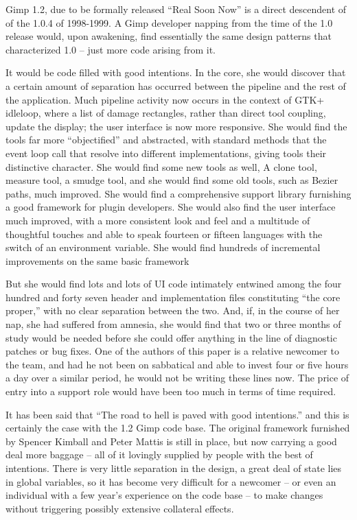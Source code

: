 
Gimp 1.2, due to be formally released ``Real Soon Now'' is a direct
descendent of of the 1.0.4 of 1998-1999. A Gimp developer napping from
the time of the 1.0 release would, upon awakening, find essentially
the same design patterns that characterized 1.0 -- just more code
arising from it.

It would be code filled with good intentions. In the core, she would
discover that a certain amount of separation has occurred between the
pipeline and the rest of the application. Much pipeline activity now
occurs in the context of GTK+ idleloop, where a list of damage
rectangles, rather than direct tool coupling, update the display; the
user interface is now more responsive. She would find the tools far
more ``objectified'' and abstracted, with standard methods that the
event loop call that resolve into different implementations, giving
tools their distinctive character. She would find some new tools as
well, A clone tool, measure tool, a smudge tool, and she would find
some old tools, such as Bezier paths, much improved. She would find
a comprehensive support library furnishing a good framework for plugin
developers. She would also find the user interface much improved, with a more
consistent look and feel and a multitude of thoughtful touches and
able to speak fourteen or fifteen languages with the switch of an
environment variable. She would find hundreds of incremental improvements
on the same basic framework

But she would find lots and lots of UI code intimately entwined among
the four hundred and forty seven header and implementation files
constituting ``the core proper,'' with no clear separation between the
two. And, if, in the course of her nap, she had suffered from amnesia,
she would find that two or three months of study would be needed
before she could offer anything in the line of diagnostic patches or
bug fixes. One of the authors of this paper is a relative newcomer to
the team, and had he not been on sabbatical and able to invest four or
five hours a day over a similar period, he would not be writing these
lines now. The price of entry into a support role would have been too
much in terms of time required.

 
It has been said that ``The road to hell is paved with good intentions.''
and this is certainly the case with the 1.2 Gimp code base. The original
framework furnished by Spencer Kimball and Peter Mattis is still in
place, but now carrying a good deal more baggage -- all of it lovingly
supplied by people with the best of intentions. There is very little 
separation in the design, a great deal of state lies in global variables,
so it has become very difficult for a newcomer -- or even an individual
with a few year's experience on the code base -- to make changes 
without triggering possibly extensive collateral effects.

